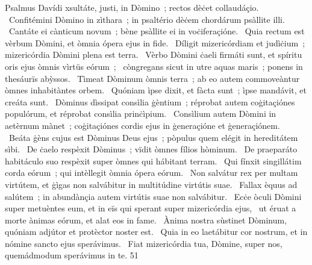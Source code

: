 { Psalmus Davídi}
{%
xsultáte, justi, in Dòmino~; rectos dèċet collaudáçio. 
~Confitémini Dòmino in zìthara~; in psaltério dèċem chordárum psàllite illi. 
~Cantáte ei cànticum novum~; bène psàllite ei in voċiferaçióne. 
~Quia rectum est vèrbum Dòmini, et òmnia ópera ejus in fide. 
~Díligit mizericórdiam et judìċium~; mizericórdia Dòmini plena est terra. 
~Vèrbo Dòmini ċaeli firmáti sunt, et spíritu oris ejus òmnis vìrtüs eórum~; 
~còngregans sicut in utre aquas maris~; ponens in thesáurïs abỳssos. 
~Tìmeat Dòminum òmnis terra~; ab eo autem commoveàntur òmnes inhabitàntes orbem. 
~Quóniam ìpse dixit, et fàcta sunt~; ìpse mandávit, et creáta sunt. 
~Dòminus dìssipat consìlia ġèntium~; réprobat autem coġitaçiónes populórum, et réprobat consìlia prinċìpium. 
~Consìlium autem Dòmini in aetèrnum mànet~; coġitaçiónes cordis ejus in ġeneraçióne et ġeneraçiónem. 
~Beáta ġèns cujus est Dòminus Deus ejus~; pòpulus quem elégit in hereditátem sìbi. 
~De ċaelo respèxit Dòminus~; vïdit òmnes fílios hòminum. 
~De praeparáto habitáculo suo respèxit super òmnes qui hábitant terram. 
~Qui fínxit singillátim corda eórum~; qui intèllegit òmnia ópera eórum. 
~Non salvátur rex per multam virtútem, et ġìgas non salvábitur in multitúdine virtútis suae. 
~Fallax èquus ad salútem~; in abundànçia autem virtútis suae non salvábitur. 
~Ecċe òculi Dòmini super metuèntes eum, et in eïs qui sperant super mizericórdia ejus, 
~ut éruat a morte ànimas eórum, et alat eos in fame. 
~Ànima nostra sùstinet Dòminum, quóniam adjútor et protèctor noster est. 
~Quia in eo laetábitur cor nostrum, et in nómine sancto ejus sperávimus. 
~Fiat mizericórdia tua, Dòmine, super nos, quemádmodum sperávimus in te. 
}
{5}{1}
